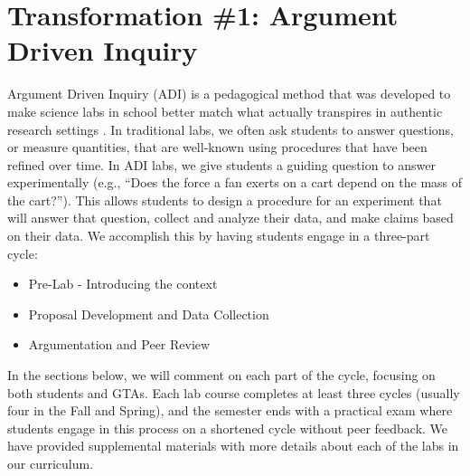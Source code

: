 \documentclass[aip, numerical, preprint]{revtex4-2}
\begin{document}
\section{Transformation \#1: Argument Driven Inquiry}
Argument Driven Inquiry (ADI) is a pedagogical method that was developed to make science labs
in school better match what actually transpires in authentic research settings
\citep{Walker2011,Sampson2011,Walker2016}.  In traditional labs, we often ask students to
answer questions, or measure quantities, that are well-known using procedures that have been
refined over time.  In ADI labs, we give students a guiding question to answer experimentally
(e.g., ``Does the force a fan exerts on a cart depend on the mass of the cart?''). This allows
students to design a procedure for an experiment that will answer that question, collect and
analyze their data, and make claims based on their data.  We accomplish this by having students
engage in a three-part cycle:
\begin{itemize}
  \item Pre-Lab - Introducing the context
  \item Proposal Development and Data Collection
  \item Argumentation and Peer Review
\end{itemize}
In the sections below, we will comment on each part of the cycle, focusing on both students and
GTAs. Each lab course completes at least three cycles (usually four in the Fall and Spring),
and the semester ends with a practical exam where students engage in this process on a
shortened cycle without peer feedback.\cite{Wolf2019} We have provided supplemental materials
with more details about each of the labs in our curriculum.
\end{document}
